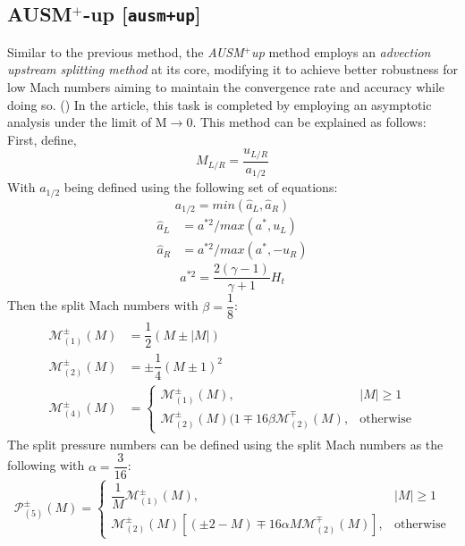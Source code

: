 \documentclass[a4paper, 12pt]{article}
\begin{document}
\subsection{AUSM$^+$-up [\texttt{ausm+up}]}
Similar to the previous method, the \textit{AUSM$^+$up} method employs an \textit{advection upstream splitting method} at its core, modifying it to achieve better robustness for low Mach numbers aiming to maintain the convergence rate and accuracy while doing so. (\cite{ausm+up}) In the article, this task is completed by employing an asymptotic analysis under the limit of M$\rightarrow{}$0. This method can be explained as follows: \\
First, define,
\begin{equation}
    M_{L/R}=\dfrac{u_{L/R}}{a_{1/2}}
\end{equation}
With $a_{1/2}$ being defined using the following set of equations:
\begin{equation}
    a_{1/2} = min(\hat{a}_L,\hat{a}_R)
\end{equation}
\begin{equation}
    \begin{split}
        \hat{a}_L&=a^{*2}/max(a^*, u_L) \\
        \hat{a}_R&=a^{*2}/max(a^*, -u_R)
    \end{split}
\end{equation}
\begin{equation}
    a^{*2}=\dfrac{2(\gamma-1)}{\gamma+1}H_t
\end{equation}
Then the split Mach numbers with $\beta=\dfrac{1}{8}$:
\begin{equation}
    \begin{split}
        \mathscr{M}^\pm_{(1)}(M) &= \dfrac{1}{2}(M\pm|M|) \\
        \mathscr{M}^\pm_{(2)}(M) &= \pm\dfrac{1}{4}(M\pm1)^2 \\
        \mathscr{M}^\pm_{(4)}(M) &=
        \begin{cases}
            \mathscr{M}^\pm_{(1)}(M), & |M|\geq1 \\
            \mathscr{M}^\pm_{(2)}(M)(1\mp16\beta\mathscr{M}^\mp_{(2)}(M), & \text{otherwise}
        \end{cases}
    \end{split}
\end{equation}
The split pressure numbers can be defined using the split Mach numbers as the following with $\alpha=\dfrac{3}{16}$:
\begin{equation}
    \mathscr{P}^\pm_{(5)}(M)=
    \begin{cases}
        \dfrac{1}{M}\mathscr{M}^\pm_{(1)}(M), & |M| \geq 1\\
        \mathscr{M}^\pm_{(2)}(M)[(\pm2-M)\mp16\alpha M \mathscr{M}^\mp_{(2)}(M)], & \text{otherwise}
    \end{cases}
\end{equation}
\end{document}

